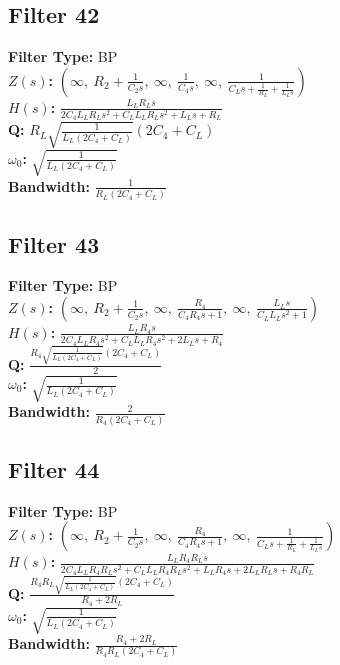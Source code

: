 \documentclass{article}
\begin{document}
\subsection*{Filter 42}
\textbf{Filter Type:} BP \\ 
\textbf{$Z(s)$:} $\left( \infty, \  R_{2} + \frac{1}{C_{2} s}, \  \infty, \  \frac{1}{C_{4} s}, \  \infty, \  \frac{1}{C_{L} s + \frac{1}{R_{L}} + \frac{1}{L_{L} s}}\right)$ \\ 
\textbf{$H(s)$:} $\frac{L_{L} R_{L} s}{2 C_{4} L_{L} R_{L} s^{2} + C_{L} L_{L} R_{L} s^{2} + L_{L} s + R_{L}}$ \\ 
\textbf{Q:} $R_{L} \sqrt{\frac{1}{L_{L} \left(2 C_{4} + C_{L}\right)}} \left(2 C_{4} + C_{L}\right)$ \\ 
\textbf{$\omega_0$:} $\sqrt{\frac{1}{L_{L} \left(2 C_{4} + C_{L}\right)}}$ \\ 
\textbf{Bandwidth:} $\frac{1}{R_{L} \left(2 C_{4} + C_{L}\right)}$ \\ 
\subsection*{Filter 43}
\textbf{Filter Type:} BP \\ 
\textbf{$Z(s)$:} $\left( \infty, \  R_{2} + \frac{1}{C_{2} s}, \  \infty, \  \frac{R_{4}}{C_{4} R_{4} s + 1}, \  \infty, \  \frac{L_{L} s}{C_{L} L_{L} s^{2} + 1}\right)$ \\ 
\textbf{$H(s)$:} $\frac{L_{L} R_{4} s}{2 C_{4} L_{L} R_{4} s^{2} + C_{L} L_{L} R_{4} s^{2} + 2 L_{L} s + R_{4}}$ \\ 
\textbf{Q:} $\frac{R_{4} \sqrt{\frac{1}{L_{L} \left(2 C_{4} + C_{L}\right)}} \left(2 C_{4} + C_{L}\right)}{2}$ \\ 
\textbf{$\omega_0$:} $\sqrt{\frac{1}{L_{L} \left(2 C_{4} + C_{L}\right)}}$ \\ 
\textbf{Bandwidth:} $\frac{2}{R_{4} \left(2 C_{4} + C_{L}\right)}$ \\ 
\subsection*{Filter 44}
\textbf{Filter Type:} BP \\ 
\textbf{$Z(s)$:} $\left( \infty, \  R_{2} + \frac{1}{C_{2} s}, \  \infty, \  \frac{R_{4}}{C_{4} R_{4} s + 1}, \  \infty, \  \frac{1}{C_{L} s + \frac{1}{R_{L}} + \frac{1}{L_{L} s}}\right)$ \\ 
\textbf{$H(s)$:} $\frac{L_{L} R_{4} R_{L} s}{2 C_{4} L_{L} R_{4} R_{L} s^{2} + C_{L} L_{L} R_{4} R_{L} s^{2} + L_{L} R_{4} s + 2 L_{L} R_{L} s + R_{4} R_{L}}$ \\ 
\textbf{Q:} $\frac{R_{4} R_{L} \sqrt{\frac{1}{L_{L} \left(2 C_{4} + C_{L}\right)}} \left(2 C_{4} + C_{L}\right)}{R_{4} + 2 R_{L}}$ \\ 
\textbf{$\omega_0$:} $\sqrt{\frac{1}{L_{L} \left(2 C_{4} + C_{L}\right)}}$ \\ 
\textbf{Bandwidth:} $\frac{R_{4} + 2 R_{L}}{R_{4} R_{L} \left(2 C_{4} + C_{L}\right)}$ \\ 
\end{document}
